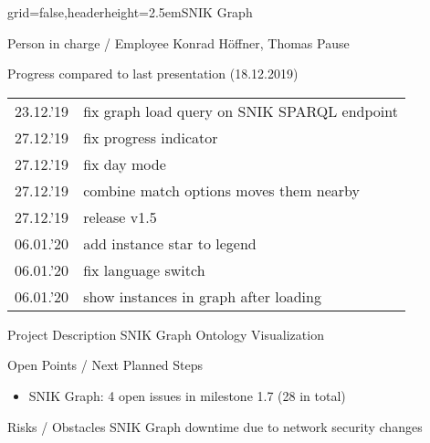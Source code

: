 \documentclass[]{kiesgrube}
\begin{document}
\begin{poster}%
{grid=false,headerheight=2.5em}{}{SNIK Graph}{}

\begin{posterbox}[name=person,column=0,row=0]{Person in charge / Employee}
Konrad Höffner, Thomas Pause
\end{posterbox}
\begin{posterbox}[name=progress,below=person]{Progress compared to last presentation (18.12.2019)}
\begin{tabulary}{\textwidth}{lL}
23.12.'19	&fix graph load query on SNIK SPARQL endpoint\\
27.12.'19	&fix progress indicator\\
27.12.'19	&fix day mode\\
27.12.'19	&combine match options moves them nearby\\
27.12.'19	&release v1.5 \\
06.01.'20	&add instance star to legend\\
06.01.'20	&fix language switch\\
06.01.'20	&show instances in graph after loading\\
\end{tabulary}
\end{posterbox}
\begin{posterbox}[name=description,column=1,row=0]{Project Description}
\small
SNIK Graph Ontology Visualization
\end{posterbox}
\begin{posterbox}[name=open,column=1,below=description]{Open Points / Next Planned Steps}
\footnotesize
\begin{itemize}
\item SNIK Graph: 4 open issues in milestone 1.7 (28 in total)
\end{itemize}
\end{posterbox}
\begin{posterbox}[name=risks,column=1,below=open]{Risks / Obstacles}
SNIK Graph downtime due to network security changes 

\end{posterbox}
\end{poster}
\end{document}
